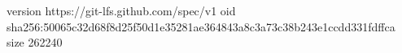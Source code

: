 version https://git-lfs.github.com/spec/v1
oid sha256:50065c32d68f8d25f50d1e35281ae364843a8c3a73c38b243e1ccdd331fdffca
size 262240
